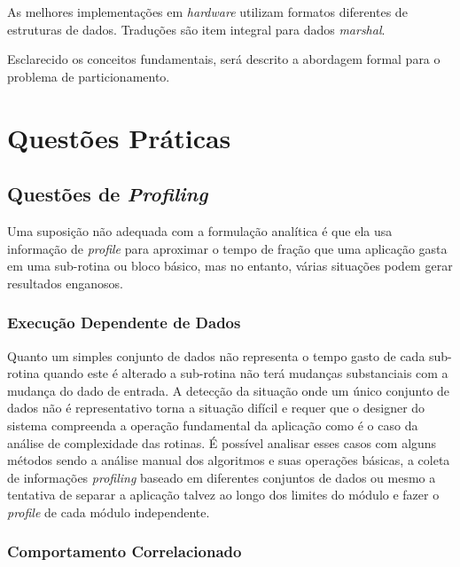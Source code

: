 As melhores implementações em \textit{hardware} utilizam formatos diferentes de estruturas de dados. Traduções são item integral para dados \textit{marshal}.



Esclarecido os conceitos fundamentais, será descrito a abordagem formal para o problema de particionamento.



\section{Questões Práticas}

\subsection{Questões de \textit{Profiling}}

Uma suposição não adequada com a formulação analítica é que ela usa informação de \textit{profile} para aproximar o tempo de fração que uma aplicação gasta em uma sub-rotina ou bloco básico, mas no entanto, várias situações podem gerar resultados enganosos.



\subsubsection{Execução Dependente de Dados}

Quanto um simples conjunto de dados não representa o tempo gasto de cada sub-rotina quando este é alterado a sub-rotina não terá mudanças substanciais com a mudança do dado de entrada. A detecção da situação onde um único conjunto de dados não é representativo torna a situação difícil e requer que o designer do sistema compreenda a operação fundamental da aplicação como é o caso da análise de complexidade das rotinas. É possível analisar esses casos com alguns métodos sendo a análise manual dos algoritmos e suas operações básicas, a coleta de informações \textit{profiling} baseado em diferentes conjuntos de dados ou mesmo a tentativa de separar a aplicação talvez ao longo dos limites do módulo e fazer o \textit{profile} de cada módulo independente.



\subsubsection{Comportamento Correlacionado}

